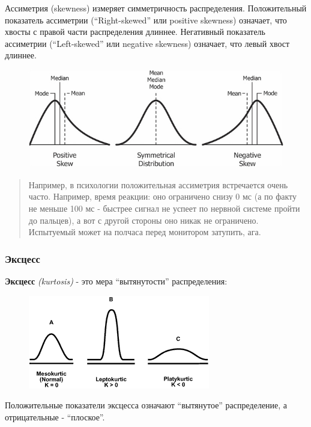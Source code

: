 \documentclass[]{book}
\begin{document}
Ассиметрия (skewness) измеряет симметричность распределения.
Положительный показатель ассиметрии (``Right-skewed'' или positive
skewness) означает, что хвосты с правой части распределения длиннее.
Негативный показатель ассиметрии (``Left-skewed'' или negative skewness)
означает, что левый хвост длиннее.

\begin{figure}
\centering
\includegraphics{images/7180OS_01_180.jpg}
\caption{}
\end{figure}

\begin{quote}
Например, в психологии положительная ассиметрия встречается очень часто.
Например, время реакции: оно ограничено снизу 0 мс (а по факту не меньше
100 мс - быстрее сигнал не успеет по нервной системе пройти до пальцев),
а вот с другой стороны оно никак не ограничено. Испытуемый может на
полчаса перед монитором затупить, ага.
\end{quote}

\subsubsection{Эксцесс}\label{kurtosis}

\textbf{Эксцесс} \emph{(kurtosis)} - это мера ``вытянутости''
распределения:

\begin{figure}
\centering
\includegraphics{images/kurtosis.gif}
\caption{}
\end{figure}

Положительные показатели эксцесса означают ``вытянутое'' распределение,
а отрицательные - ``плоское''.
\end{document}
